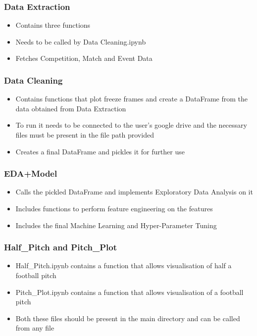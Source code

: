 \subsubsection{Data Extraction}
\begin{itemize}
        \item Contains three functions
        \item Needs to be called by Data Cleaning.ipynb
        \item Fetches Competition, Match and Event Data
    \end{itemize}

\subsubsection{Data Cleaning}
\begin{itemize}
        \item Contains functions that plot freeze frames and create a DataFrame from the data obtained from Data Extraction
        \item To run it needs to be connected to the user's google drive and the necessary files must be present in the file path provided
        \item Creates a final DataFrame and pickles it for further use
    \end{itemize}

\subsubsection{EDA+Model}
\begin{itemize}
        \item Calls the pickled DataFrame and implements Exploratory Data Analysis on it
        \item Includes functions to perform feature engineering on the features
        \item Includes the final Machine Learning and Hyper-Parameter Tuning
    \end{itemize}

\subsubsection{Half\_Pitch and Pitch\_Plot}
\begin{itemize}
        \item Half\_Pitch.ipynb contains a function that allows visualisation of half a football pitch
        \item Pitch\_Plot.ipynb contains a function that allows visualisation of a football pitch
        \item Both these files should be present in the main directory and can be called from any file
    \end{itemize}

